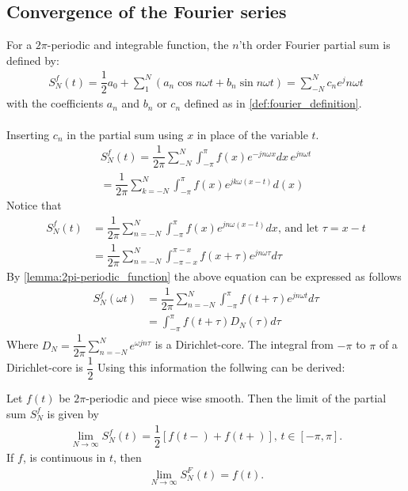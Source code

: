 \subsection{Convergence of the Fourier series}
For a $2\pi$-periodic and integrable function, the $n$'th order Fourier partial sum is defined by: 
\begin{align}\label{eq:partialsumFourierSeries}
	S_N^f(t) = \dfrac{1}{2} a_0 + \sum_1^N\left(a_n \cos n\omega t + b_n \sin n \omega t \right) = \sum_{-N}^N c_n e^jn\omega t
\end{align}
with the coefficients $a_n$ and $b_n$ or $c_n$ defined as in \ref{def:fourier_definition}.\\
\\
Inserting $c_n$ in the partial sum using $x$ in place of the variable $t$.
\begin{align*}
	S_N^f(t)
	= \dfrac{1}{2\pi}\sum_{-N}^N \int_{-\pi}^\pi f(x) e^{-j n \omega x} dx\, e^{jn\omega t}\\
	= \dfrac{1}{2\pi}\sum_{k = -N}^N \int_{-\pi}^\pi f(x) e^{j k \omega (x-t)} d(x)
\end{align*}
Notice that 
\begin{align*}
	S_N^f (t) 
	&= \dfrac{1}{2\pi} \sum_{n=-N}^N \int_{-\pi}^\pi f(x)e^{jn\omega(x-t)} dx\text{, and let } 
	\tau 
	= x-t\\
	&= \dfrac{1}{2\pi} \sum_{n = -N}^N \int_{-\pi - x}^{\pi - x} f(x + \tau ) e^{j n\omega \tau} d\tau
\end{align*}
By \ref{lemma:2pi-periodic_function} the above equation can be expressed as follows
\begin{align*}
	S_N^f (\omega t) 
	&= \dfrac{1}{2\pi} \sum_{n=-N}^N \int_{-\pi}^\pi f(t + \tau) e^{jn \omega t} d\tau\\
	&= \int_{-\pi}^\pi f(t + \tau) D_N(\tau) d\tau
\end{align*}
Where $D_N = \dfrac{1}{2\pi}\sum_{n=-N}^{N}e^{\omega jn\tau}$ is a Dirichlet-core. 
The integral from $-\pi$ to $\pi$ of a Dirichlet-core is $\dfrac{1}{2}$ 
Using this information the follwing can be derived:
\begin{theorem}
	Let $f(t)$ be $2\pi$-periodic and piece wise smooth. Then the limit of the partial sum $S_N^f$ is given by
	 \begin{align*}
	 	\lim_{N\to\infty} S_N^f (t) = \dfrac{1}{2}\left[f(t-) + f(t+)\right], \, t\in [-\pi, \pi].
	 \end{align*}
	If $f$, is continuous in $t$, then
	\begin{align*}
		\lim_{N\to \infty} S_N^F(t) = f(t).
	\end{align*}
\end{theorem}
